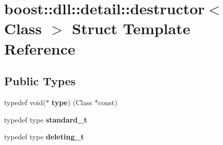 \hypertarget{a01360}{}\section{boost\+:\+:dll\+:\+:detail\+:\+:destructor$<$ Class $>$ Struct Template Reference}
\label{a01360}
\subsection*{Public Types}
\begin{DoxyCompactItemize}
\item 
\mbox{\label{a01360_a155dbf742e9c6499f52041d0b9f061be}} 
typedef void($\ast$ {\bfseries type}) (Class $\ast$const)
\item 
\mbox{\label{a01360_a6a72bebfcaef05b746a9b4cf93d66c50}} 
typedef type {\bfseries standard\+\_\+t}
\item 
\mbox{\label{a01360_aff7ad402a5e8d7c8d1d086f73f3acf88}} 
typedef type {\bfseries deleting\+\_\+t}
\end{DoxyCompactItemize}
